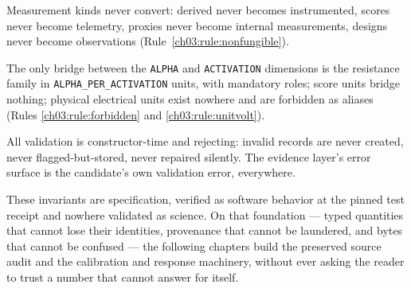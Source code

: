 \begin{invariant}\label{ch03:inv:nonfungible}
Measurement kinds never convert: derived never becomes instrumented, scores never become telemetry, proxies never become internal measurements, designs never become observations (Rule~\ref{ch03:rule:nonfungible}).
\end{invariant}

\begin{invariant}\label{ch03:inv:dimclosure}
The only bridge between the \texttt{ALPHA} and \texttt{ACTIVATION} dimensions is the resistance family in \texttt{ALPHA\_PER\_ACTIVATION} units, with mandatory roles; score units bridge nothing; physical electrical units exist nowhere and are forbidden as aliases (Rules \ref{ch03:rule:forbidden} and \ref{ch03:rule:unitvolt}).
\end{invariant}

\begin{invariant}\label{ch03:inv:failclosed}
All validation is constructor-time and rejecting: invalid records are never created, never flagged-but-stored, never repaired silently. The evidence layer's error surface is the candidate's own validation error, everywhere.
\end{invariant}

These invariants are specification, verified as software behavior at the pinned test receipt and nowhere validated as science. On that foundation --- typed quantities that cannot lose their identities, provenance that cannot be laundered, and bytes that cannot be confused --- the following chapters build the preserved source audit and the calibration and response machinery, without ever asking the reader to trust a number that cannot answer for itself.
